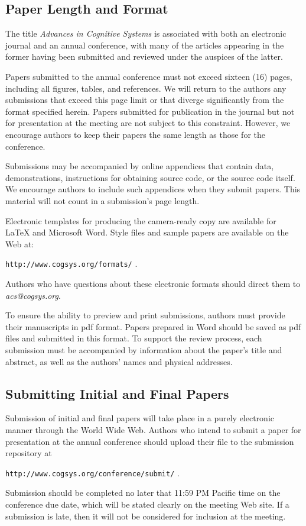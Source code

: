 \documentclass[11pt,letterpaper]{article}
\begin{document}
\subsection{Paper Length and Format}

The title {\it Advances in Cognitive Systems\/} is associated with
both an electronic journal and an annual conference, with many of the
articles appearing in the former having been submitted and reviewed
under the auspices of the latter. 

Papers submitted to the annual conference must not exceed sixteen (16)
pages, including all figures, tables, and references. We will return
to the authors any submissions that exceed this page limit or that
diverge significantly from the format specified herein.
Papers submitted for publication in the journal but not for presentation
at the meeting are not subject to this constraint. However, we encourage 
authors to keep their papers the same length as those for the conference.

Submissions may be accompanied by online appendices that contain data,
demonstrations, instructions for obtaining source code, or the source
code itself. We encourage authors to include such appendices when they
submit papers. This material will not count in a submission's page
length.

Electronic templates for producing the camera-ready copy are available
for \LaTeX\/ and Microsoft Word. Style files and sample papers are 
available on the Web at: 
\vskip 0.1in
\begin{small}
\centerline{{\tt http://www.cogsys.org/formats/} .}
\end{small}
\vskip 0.1in
\noindent
Authors who have questions about these electronic formats should direct
them to {\sl acs@cogsys.org}.

To ensure the ability to preview and print submissions, authors must
provide their manuscripts in pdf format. Papers prepared in Word
should be saved as pdf files and submitted in this format. To support
the review process, each submission must be accompanied by information
about the paper's title and abstract, as well as the authors' names
and physical addresses. 

\subsection{Submitting Initial and Final Papers}

Submission of initial and final papers will take place in a purely
electronic manner through the World Wide Web. Authors who intend to
submit a paper for presentation at the annual conference should upload
their file to the submission repository at
\vskip 0.1in
\begin{small}
\centerline{{\tt http://www.cogsys.org/conference/submit/} .}
\end{small}
\vskip 0.12in
\noindent
Submission should be completed no later that 11:59 PM Pacific time 
on the conference due date, which will be stated clearly on the 
meeting Web site. If a submission is late, then it will not be 
considered for inclusion at the meeting.
\end{document}
